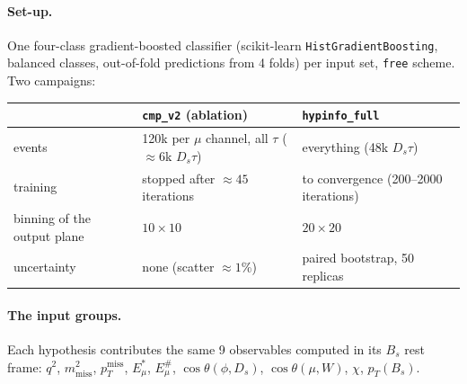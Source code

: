 \documentclass[10pt,a4paper]{article}
\newcommand{\code}[1]{\texttt{#1}}
\newcommand{\Ds}{D_s}
\newcommand{\mm}{m^2_\text{miss}}
\newcommand{\Es}{E^*_\mu}
\begin{document}
\paragraph{Set-up.} One four-class gradient-boosted classifier (scikit-learn \code{HistGradientBoosting}, balanced
classes, out-of-fold predictions from 4 folds) per input set, \code{free} scheme. Two campaigns:

\begin{center}
\small
\begin{tabular}{lll}
\toprule
 & \code{cmp\_v2} (ablation) & \code{hypinfo\_full} \\
\midrule
events & 120k per $\mu$ channel, all $\tau$ ($\approx6$k $\Ds\tau$) & everything (48k $\Ds\tau$) \\
training & stopped after $\approx45$ iterations & to convergence (200--2000 iterations) \\
binning of the output plane & $10\times10$ & $20\times20$ \\
uncertainty & none (scatter $\approx1$\%) & paired bootstrap, 50 replicas \\
\bottomrule
\end{tabular}
\end{center}

\paragraph{The input groups.} Each hypothesis contributes the same 9 observables computed in its $B_s$ rest frame:
$q^2$, $\mm$, $p_T^\text{miss}$, $\Es$, $E^\#_\mu$, $\cos\theta(\phi,\Ds)$, $\cos\theta(\mu,W)$, $\chi$, $p_T(B_s)$.
\end{document}

